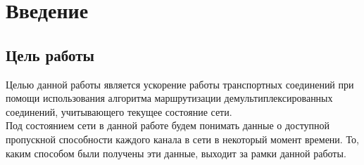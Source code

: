 \documentclass[a4paper]{article}
\begin{document}
\tableofcontents
\newpage

\section{Введение}

\subsection{Цель работы}
Целью данной работы является ускорение работы транспортных соединений при помощи использования алгоритма маршрутизации демультиплексированных соединений, учитывающего текущее состояние сети.\\
Под состоянием сети в данной работе будем понимать данные о доступной пропускной способности каждого канала в сети в некоторый момент времени. То, каким способом были получены эти данные, выходит за рамки данной работы.
\end{document}
